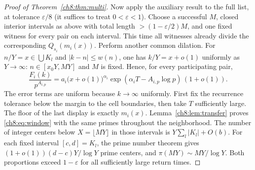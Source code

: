 \documentclass[11pt,a4paper,oneside,openany]{report}
\theoremstyle{remark}\newtheorem{remark}[theorem]{Remark}
\numberwithin{equation}{section}
\begin{document}
\begin{proof}[Proof of Theorem~\ref{ch8:thm:multi}]
Now apply the auxiliary result to the full list, at tolerance $\varepsilon/8$ (it suffices to treat $0<\varepsilon<1$). Choose a successful $M$, closed interior intervals as above with total length $>(1-\varepsilon/2)M$, and one fixed witness for every pair on each interval. This time all witnesses already divide the corresponding $Q_{s_i}(m_i(x))$. Perform another common dilation. For $n/Y=x\in\bigcup K_l$ and $|k-n|\le w(n)$, one has $k/Y=x+o(1)$ uniformly as $Y\to\infty$: $n\in[x_0Y,MY]$ and $M$ is fixed. Hence, for every participating pair,
\[
 \frac{F_i(k)}{p^{A_{i,p}}}
 =a_i\bigl(x+o(1)\bigr)^{\alpha_i}
       \exp(\alpha_i T-A_{i,p}\log p)\,(1+o(1)).
\]
The error terms are uniform because $k\to\infty$ uniformly. First fix the recurrence tolerance below the margin to the cell boundaries, then take $T$ sufficiently large. The floor of the last display is exactly $m_i(x)$. Lemma~\ref{ch8:lem:transfer} proves \eqref{ch8:eq:window} with the same primes throughout the neighborhood. The number of integer centers below $X=\lfloor MY\rfloor$ in those intervals is $Y\sum_l |K_l|+O(b)$. For each fixed interval $[c,d]=K_l$, the prime number theorem gives $(1+o(1))(d-c)Y/\log Y$ prime centers, and $\pi(MY)\sim MY/\log Y$. Both proportions exceed $1-\varepsilon$ for all sufficiently large return times.
\end{proof}
\end{document}
